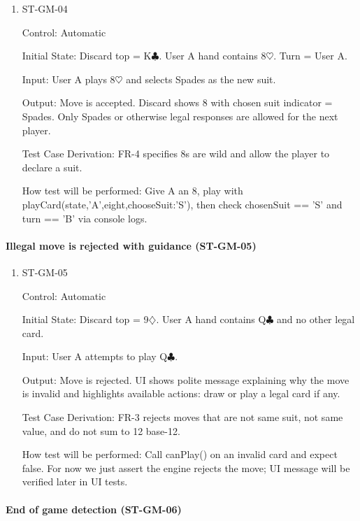 \documentclass[12pt, titlepage]{article}
\begin{document}
\begin{enumerate}
\item{ST-GM-04\\}

Control: Automatic
					
Initial State: Discard top = K$\clubsuit$. User A hand contains 8$\heartsuit$. Turn = User A.
					
Input: User A plays 8$\heartsuit$ and selects Spades as the new suit.
					
Output: Move is accepted. Discard shows 8 with chosen suit indicator = Spades. Only Spades or otherwise legal responses are allowed for the next player.

Test Case Derivation: FR-4 specifies 8s are wild and allow the player to declare a suit.

How test will be performed: Give A an 8, play with playCard(state,'A',eight,{chooseSuit:'S'}), then check chosenSuit == 'S' and turn == 'B' via console logs.
\end{enumerate}

\paragraph{Illegal move is rejected with guidance (ST-GM-05)}

\begin{enumerate}
\item{ST-GM-05\\}

Control: Automatic
					
Initial State: Discard top = 9$\diamondsuit$. User A hand contains Q$\clubsuit$ and no other legal card.
					
Input: User A attempts to play Q$\clubsuit$.
					
Output: Move is rejected. UI shows polite message explaining why the move is invalid and highlights available actions: draw or play a legal card if any.

Test Case Derivation: FR-3 rejects moves that are not same suit, not same value, and do not sum to 12 base-12.

How test will be performed: Call canPlay() on an invalid card and expect false. For now we just assert the engine rejects the move; UI message will be verified later in UI tests.
\end{enumerate}

\paragraph{End of game detection (ST-GM-06)}
\end{document}
